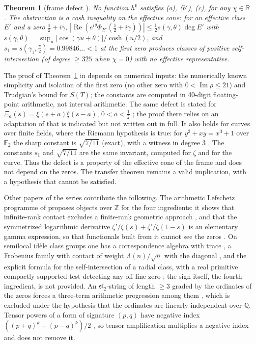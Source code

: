 \documentclass[11pt]{amsart}
\newtheorem{theorem}{Theorem}[section]
\theoremstyle{definition}
\theoremstyle{remark}
\numberwithin{equation}{section}
\newcommand{\R}{\mathbb{R}}
\newcommand{\Z}{\mathbb{Z}}
\newcommand{\Q}{\mathbb{Q}}
\DeclareMathOperator{\Rel}{Re}
\DeclareMathOperator{\Iml}{Im}
\begin{document}
\begin{theorem}[frame defect {\cite[Theorems~8.6 and 8.8]{P47}}]\label{w7:thm:defect}
No function $h^0$ satisfies (a), (b$'$), (c), for any $\chi\in\R$. The obstruction is a cosh inequality on the
effective cone: for an effective class $E'$ and a zero $\frac12+i\gamma$,
$|\Rel(e^{i\theta}\Phi_{E'}(\frac12+i\gamma))|\le\frac12 s(\gamma,\theta)\deg E'$ with
$s(\gamma,\theta)=\sup_u|\cos(\gamma u+\theta)|/\cosh(u/2)$, and $s_1=s(\gamma_1,\frac\pi2)=0.99846\ldots<1$ at
the first zero produces classes of positive self-intersection (of degree $\ge325$ when $\chi=0$) with no
effective representative.
\end{theorem}

The proof of Theorem~\ref{w7:thm:defect} in \cite{P47} depends on numerical inputs: the numerically known
simplicity and isolation of the first zero (no other zero with $0<\Iml\rho\le21$) and Trudgian's bound for
$S(T)$; the constants are computed in 40-digit floating-point arithmetic, not interval arithmetic. The same
defect is stated for $\Xi_a(s)=\xi(s+a)\xi(s-a)$, $0<a<\frac12$ \cite[Theorem~9.4]{P47}; the proof there relies on
an adaptation of \cite[Theorem~6.2]{P45} that is indicated but not written out in full. It also holds for curves
over finite fields, where the Riemann hypothesis is true: for $y^2+xy=x^3+1$ over $\mathbb F_2$ the sharp
constant is $\sqrt{7/11}$ (exact), with a witness in degree $3$ \cite[Proposition~10.7, Theorem~10.8]{P47}. The
constants $s_1$ and $\sqrt{7/11}$ are the same invariant, computed for $\zeta$ and for the curve. Thus the
defect is a property of the effective cone of the frame and does not depend on the zeros. The transfer theorem
remains a valid implication, with a hypothesis that cannot be satisfied.

Other papers of the series contribute the following. The arithmetic Lefschetz programme of \cite{P42} proposes
objects over $\Z$ for the four ingredients; it shows that infinite-rank contact excludes a finite-rank geometric
approach \cite[Theorem~9.1]{P42}, and that the symmetrized logarithmic derivative
$\zeta'/\zeta(s)+\zeta'/\zeta(1-s)$ is an elementary gamma expression, so that functionals built from it cannot
see the zeros \cite[Proposition~1.1]{P42}. On semilocal id\`ele class groups one has a correspondence algebra
with trace \cite{P43}, a Frobenius family with contact of weight $\Lambda(n)/\sqrt n$ with the diagonal
\cite{P44}, and the explicit formula for the self-intersection of a radial class, with a real primitive compactly
supported test detecting any off-line zero \cite[Theorem~6.2]{P45}; the sign itself, the fourth ingredient, is
not provided. An $\mathfrak{sl}_2$-string of length $\ge3$ graded by the ordinates of the zeros forces a
three-term arithmetic progression among them \cite[Proposition~5.1]{P17}, which is excluded under the hypothesis
that the ordinates are linearly independent over $\Q$. Tensor powers of a form of signature $(p,q)$ have negative
index $((p+q)^k-(p-q)^k)/2$ \cite[Theorem~4.1, Proposition~4.3]{P28}, so tensor amplification multiplies a
negative index and does not remove it.
\end{document}
